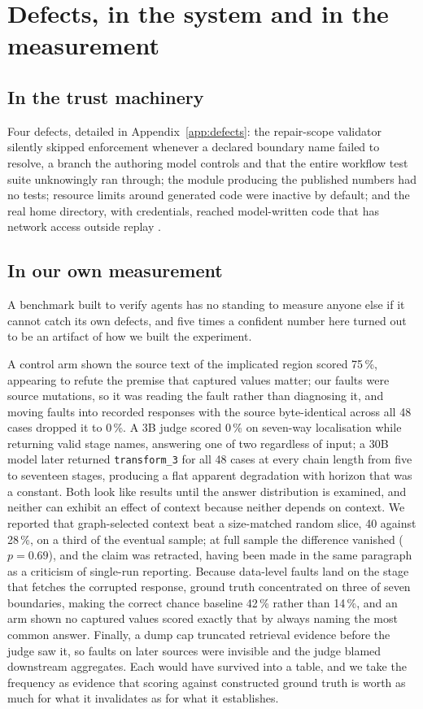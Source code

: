 \section{Defects, in the system and in the measurement}
\label{sec:defects}

\subsection{In the trust machinery}

Four defects, detailed in Appendix~\ref{app:defects}: the repair-scope validator silently
skipped enforcement whenever a declared boundary name failed to resolve, a branch the
authoring model controls and that the entire workflow test suite unknowingly ran through;
the module producing the published numbers had no tests; resource limits around generated
code were inactive by default; and the real home directory, with credentials, reached
model-written code that has network access outside replay
\cite{greshake2023injection}.

\subsection{In our own measurement}

A benchmark built to verify agents has no standing to measure anyone else if it cannot
catch its own defects, and five times a confident number here turned out to be an artifact
of how we built the experiment.

A control arm shown the source text of the implicated region scored 75\,\%, appearing to
refute the premise that captured values matter; our faults were source mutations, so it
was reading the fault rather than diagnosing it, and moving faults into recorded responses
with the source byte-identical across all 48 cases dropped it to 0\,\%. A 3B judge scored
0\,\% on seven-way localisation while returning valid stage names, answering one of two
regardless of input; a 30B model later returned \texttt{transform\_3} for all 48 cases at
every chain length from five to seventeen stages, producing a flat apparent degradation
with horizon that was a constant. Both look like results until the answer distribution is
examined, and neither can exhibit an effect of context because neither depends on context.
We reported that graph-selected context beat a size-matched random slice, 40 against
28\,\%, on a third of the eventual sample; at full sample the difference vanished
($p=0.69$), and the claim was retracted, having been made in the same paragraph as a
criticism of single-run reporting. Because data-level faults land on the stage that
fetches the corrupted response, ground truth concentrated on three of seven boundaries,
making the correct chance baseline 42\,\% rather than 14\,\%, and an arm shown no captured
values scored exactly that by always naming the most common answer. Finally, a dump cap truncated retrieval
evidence before the judge saw it, so faults on later sources were invisible and the judge
blamed downstream aggregates. Each would have survived into a table, and we take the
frequency as evidence that scoring against constructed ground truth is worth as much for
what it invalidates as for what it establishes.
